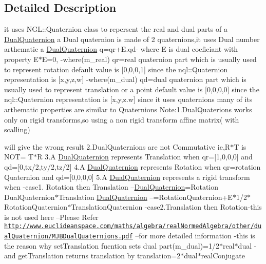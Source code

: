 \subsection{Detailed Description}
it uses N\-G\-L\-::\-Quaternion class to repersent the real and dual parts of a \hyperlink{class_dual_quaternion}{Dual\-Quaternion} a Dual quaternion is made of 2 quaternions,it uses Dual number arthematic a \hyperlink{class_dual_quaternion}{Dual\-Quaternion} q=qr+\-E.qd-\/ where E is dual coeficiant with property E$\ast$\-E=0, -\/where(m\-\_\-real) qr=real quaternion part which is usually used to represent rotation default value is \mbox{[}0,0,0,1\mbox{]} since the nql\-::\-Quaternion representation is \mbox{[}x,y,z,w\mbox{]} -\/where(m\-\_\-dual) qd=dual quaternion part which is usually used to represent translation or a point default value is \mbox{[}0,0,0,0\mbox{]} since the nql\-::\-Quaternion representation is \mbox{[}x,y,z.\-w\mbox{]} since it uses quaternions many of its arthematic properties are similar to Quaternions Note\-:1.\-Dual\-Quaterions works only on rigid transforms,so using a non rigid transform affine matrix( with scalling) 


\begin{DoxyItemize}
\item will give the wrong result 2.\-Dual\-Quaternions are not Commutative ie,R$\ast$\-T is N\-O\-T= T$\ast$\-R 3.\-A \hyperlink{class_dual_quaternion}{Dual\-Quaternion} represents Translation when qr=\mbox{[}1,0,0,0\mbox{]} and qd=\mbox{[}0,tx/2,ty/2,tz/2\mbox{]} 4.\-A \hyperlink{class_dual_quaternion}{Dual\-Quaternion} represents Rotation when qr=rotation Quaternion and qd=\mbox{[}0,0,0,0\mbox{]} 5.\-A \hyperlink{class_dual_quaternion}{Dual\-Quaternion} represents a rigid transform when -\/case1. Rotation then Translation --\hyperlink{class_dual_quaternion}{Dual\-Quaternion}=Rotation Dual\-Quaternion$\ast$\-Translation \hyperlink{class_dual_quaternion}{Dual\-Quaternion} --=Rotation\-Quaternion+\-E$\ast$1/2$\ast$\-Rotation\-Quaternion$\ast$\-Translation\-Quaternion -\/case2.\-Translation then Rotation-\/this is not used here --Please Refer \href{http://www.euclideanspace.com/maths/algebra/realNormedAlgebra/other/dualQuaternion/MJBDualQuaternions.pdf}{\tt http\-://www.\-euclideanspace.\-com/maths/algebra/real\-Normed\-Algebra/other/dual\-Quaternion/\-M\-J\-B\-Dual\-Quaternions.\-pdf} --for more detailed information -\/this is the reason why set\-Translation fucntion sets dual part(m\-\_\-dual)=1/2$\ast$real$\ast$dual -\/and get\-Translation returns translation by translation=2$\ast$dual$\ast$real\-Conjugate 
\end{DoxyItemize}

